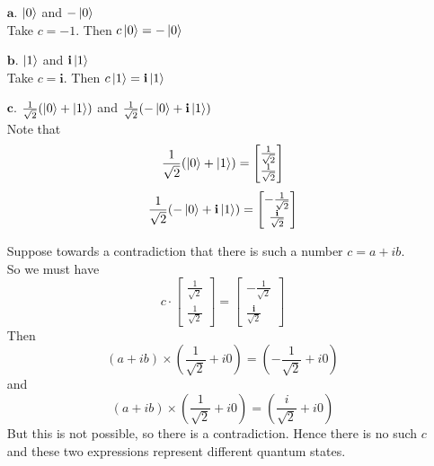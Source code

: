 \documentclass[11pt]{article}
\begin{document}
\begin{enumerate}
\item[$\textbf{a.}$] $\ket{0}$ and $-\ket{0}$ \\
	Take $c = -1$. Then $c\ket{0} = -\ket{0}$
\item[$\textbf{b.}$] $\ket{1}$ and $\textbf{i}\ket{1}$ \\
	Take $c = \textbf{i}$. Then $c\ket{1} = \textbf{i}\ket{1}$
\item[$\textbf{c.}$] 
	$\frac{1}{\sqrt{2}}(\ket{0} + \ket{1})$ and 
	$\frac{1}{\sqrt{2}}(-\ket{0} + \textbf{i}\ket{1})$ \\
	Note that 
	$$\frac{1}{\sqrt{2}}(\ket{0} + \ket{1}) = \begin{bmatrix}\frac{1}{\sqrt{2}} \\ 
			  		\frac{1}{\sqrt{2}}\end{bmatrix}$$
	$$\frac{1}{\sqrt{2}}(-\ket{0} + \textbf{i}\ket{1}) = 
		\begin{bmatrix}-\frac{1}{\sqrt{2}} \\ 
				 \frac{\textbf{i}}{\sqrt{2}}\end{bmatrix}$$

	Suppose towards a contradiction that there is such a number $c = a + ib$. \\
	So we must have $$c \cdot \begin{bmatrix}\frac{1}{\sqrt{2}} \\ 
			  		\frac{1}{\sqrt{2}}\end{bmatrix} 
					= \begin{bmatrix}-\frac{1}{\sqrt{2}} \\ 
				 \frac{\textbf{i}}{\sqrt{2}}\end{bmatrix}$$
		Then $$(a + ib) \times (\frac{1}{\sqrt{2}} + i0) = (-\frac{1}{\sqrt{2}} + i0)$$ 
		and \\ $$(a + ib) \times (\frac{1}{\sqrt{2}} + i0) = (\frac{i}{\sqrt{2}} + i0)$$ 
		But this is not possible, so there is a contradiction. 
		Hence there is no such $c$ and these two expressions represent different quantum states.
	

\end{enumerate}
\end{document}
